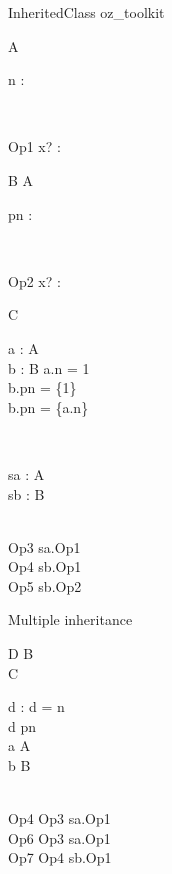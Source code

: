 \begin{zsection}
  \SECTION InheritedClass \parents oz\_toolkit
\end{zsection}

\begin{class}{A}  
  \begin{state}
    n : \nat
  \end{state}\\
  \begin{op}{Op1}
    x? : \nat
  \end{op}
\end{class}

\begin{class}{B}
  A\\
  \begin{state}
    pn : \power \nat
  \end{state}\\
  \begin{op}{Op2}
    x? : \power \nat
  \end{op}
\end{class}

\begin{class}{C}
  \begin{axdef}
    a : \poly A\\
    b : B
  \where
    a.n = 1\\
    b.pn = \{1\}\\
    b.pn = \{a.n\}
  \end{axdef}\\
  \begin{state}
    sa : \poly A\\
    sb : B
  \end{state}\\
  Op3 \sdef sa.Op1\\
  Op4 \sdef sb.Op1\\
  Op5 \sdef sb.Op2
\end{class}

Multiple inheritance
\begin{class}{D}
  B\\
  C\\
  \begin{state}
    d : \nat
  \where
    d = n\\
    d \in pn\\
    a \in \poly A\\
    b \in B
  \end{state}\\
  Op4 \sdef Op3 \land sa.Op1\\
  Op6 \sdef Op3 \land sa.Op1\\
  Op7 \sdef Op4 \land sb.Op1
\end{class}

